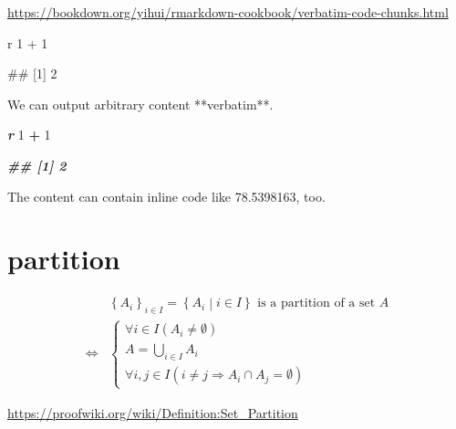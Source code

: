 \documentclass[
]{book}
\newenvironment{Shaded}{\begin{snugshade}}{\end{snugshade}}
\newcommand{\DecValTok}[1]{\textcolor[rgb]{0.00,0.00,0.81}{#1}}
\newcommand{\InformationTok}[1]{\textcolor[rgb]{0.56,0.35,0.01}{\textbf{\textit{#1}}}}
\newcommand{\NormalTok}[1]{#1}
\newcommand{\SpecialCharTok}[1]{\textcolor[rgb]{0.81,0.36,0.00}{\textbf{#1}}}
\theoremstyle{definition}
\theoremstyle{definition}
\theoremstyle{definition}
\theoremstyle{definition}
\theoremstyle{remark}
\begin{document}
\url{https://bookdown.org/yihui/rmarkdown-cookbook/verbatim-code-chunks.html}

\begin{Shaded}
\begin{Highlighting}[]

\NormalTok{\textasciigrave{}\textasciigrave{}\textasciigrave{}r}
\NormalTok{1 + 1}
\NormalTok{\textasciigrave{}\textasciigrave{}\textasciigrave{}}

\NormalTok{\textasciigrave{}\textasciigrave{}\textasciigrave{}}
\NormalTok{\#\# [1] 2}
\NormalTok{\textasciigrave{}\textasciigrave{}\textasciigrave{}}
\end{Highlighting}
\end{Shaded}

\begin{Shaded}
\begin{Highlighting}[]
\NormalTok{We can output arbitrary content **verbatim**.}


\InformationTok{\textasciigrave{}\textasciigrave{}\textasciigrave{}r}
\DecValTok{1} \SpecialCharTok{+} \DecValTok{1}
\InformationTok{\textasciigrave{}\textasciigrave{}\textasciigrave{}}

\InformationTok{\textasciigrave{}\textasciigrave{}\textasciigrave{}}
\InformationTok{\#\# [1] 2}
\InformationTok{\textasciigrave{}\textasciigrave{}\textasciigrave{}}

\NormalTok{The content can contain inline code like}
\NormalTok{78.5398163, too.}
\end{Highlighting}
\end{Shaded}

\hypertarget{partition}{%
\chapter{partition}\label{partition}}

\begin{align*}
 & \left\{ A_{i}\right\} _{i\in I}=\left\{ A_{i}\middle|i\in I\right\} \text{ is a partition of a set }A\\
\Leftrightarrow & \begin{cases}
\forall i\in I\left(A_{i}\ne\emptyset\right)\\
A=\bigcup\limits _{i\in I}A_{i}\\
\forall i,j\in I\left(i\ne j\Rightarrow A_{i}\cap A_{j}=\emptyset\right)
\end{cases}
\end{align*}

\url{https://proofwiki.org/wiki/Definition:Set_Partition}
\end{document}
